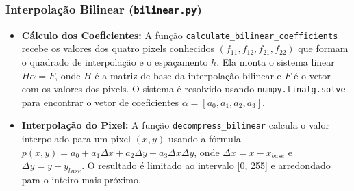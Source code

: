 \documentclass[12pt, a4paper]{article}
\begin{document}
\subsubsection{Interpolação Bilinear (\texttt{bilinear.py})}
\begin{itemize}
    \item \textbf{Cálculo dos Coeficientes:} A função \texttt{calculate\_bilinear\_coefficients} recebe os valores dos quatro pixels conhecidos $(f_{11}, f_{12}, f_{21}, f_{22})$ que formam o quadrado de interpolação e o espaçamento $h$. Ela monta o sistema linear $H \alpha = F$, onde $H$ é a matriz de base da interpolação bilinear e $F$ é o vetor com os valores dos pixels. O sistema é resolvido usando \texttt{numpy.linalg.solve} para encontrar o vetor de coeficientes $\alpha = [a_0, a_1, a_2, a_3]$.
    \item \textbf{Interpolação do Pixel:} A função \texttt{decompress\_bilinear} calcula o valor interpolado para um pixel $(x, y)$ usando a fórmula $p(x,y) = a_0 + a_1 \Delta x + a_2 \Delta y + a_3 \Delta x \Delta y$, onde $\Delta x = x - x_{base}$ e $\Delta y = y - y_{base}$. O resultado é limitado ao intervalo [0, 255] e arredondado para o inteiro mais próximo.
\end{itemize}
\end{document}
